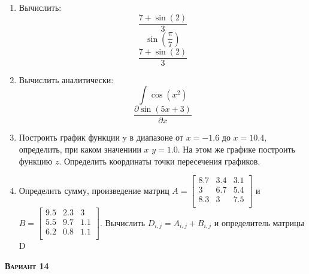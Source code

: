 \begin{enumerate}
\item Вычислить: 
\begin{equation*}\dfrac{7+\sin(2)}{3}              \end{equation*}
\begin{equation*}\sin \left( \dfrac{\pi}{7} \right)\end{equation*}
\begin{equation*}\dfrac{7+\sin(2)}{3}              \end{equation*}

\item Вычислить аналитически: 
 \begin{equation*} \int \cos(x^2)          \end{equation*}\begin{equation*} {\dfrac{\partial \sin(5 x +3)}{\partial x}} \end{equation*}
\item Построить график функции y в диапазоне от $x=-1.6$ до $x=10.4$, определить, при каком значениии $x$ $y=1.0$. На этом же графике построить функцию $z $. Определить координаты точки пересечения графиков. \item Определить сумму, произведение матриц $A=\begin{bmatrix}
8.7 &3.4 &3.1 \\
3 &6.7 &5.4 \\
8.3 &3 &7.5 \\
\end{bmatrix}
$ и $B=\begin{bmatrix}
9.5 &2.3 &3 \\
5.5 &9.7 &1.1 \\
6.2 &0.8 &1.1 \\
\end{bmatrix}
$. Вычислить $D_{i,j}=A_{i,j} + B_{i,j}$ и определитель матрицы D
\end{enumerate}
\textsc{\textbf{Вариант 14}}

